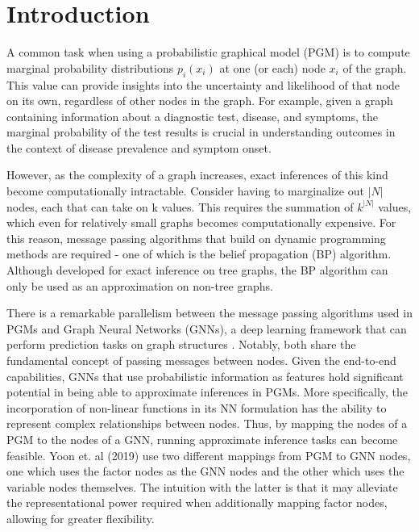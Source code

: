 \documentclass{article}
\begin{document}
\section{Introduction}

A common task when using a probabilistic graphical model (PGM) is to compute marginal probability distributions $p_i(x_i)$ at one (or each) node $x_i$ of the graph. This value can provide insights into the uncertainty and likelihood of that node on its own, regardless of other nodes in the graph. For example, given a graph containing information about a diagnostic test, disease, and symptoms, the marginal probability of the test results is crucial in understanding outcomes in the context of disease prevalence and symptom onset. 

However, as the complexity of a graph increases, exact inferences of this kind become computationally intractable. Consider having to marginalize out $|N|$ nodes, each that can take on k values. This requires the summation of $k^{|N|}$ values, which even for relatively small graphs becomes computationally expensive. For this reason, message passing algorithms that build on dynamic programming methods are required - one of which is the belief propagation (BP) algorithm. Although developed for exact inference on tree graphs, the BP algorithm can only be used as an approximation on non-tree graphs. 

There is a remarkable parallelism between the message passing algorithms used in PGMs and Graph Neural Networks (GNNs), a deep learning framework that can perform prediction tasks on graph structures \cite{gnn}. Notably, both share the fundamental concept of passing messages between nodes. Given the end-to-end capabilities, GNNs that use probabilistic information as features hold significant potential in being able to approximate inferences in PGMs. More specifically, the incorporation of non-linear functions in its NN formulation has the ability to represent complex relationships between nodes. Thus, by mapping the nodes of a PGM to the nodes of a GNN, running approximate inference tasks can become feasible. Yoon et. al (2019) use two different mappings from PGM to GNN nodes, one which uses the factor nodes as the GNN nodes and the other which uses the variable nodes themselves. The intuition with the latter is that it may alleviate the representational power required when additionally mapping factor nodes, allowing for greater flexibility. 
\end{document}
